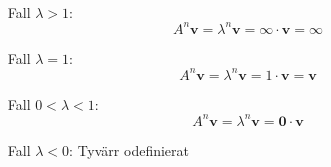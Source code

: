 ~\\
\begin{enumerate}
    \item[Fall $\lambda>1$:]
        \begin{equation*}
            A^n\bm{v}=\lambda^n\bm{v}=\infty\cdot\bm{v}=\bm{\infty}
        \end{equation*}
    \item[Fall $\lambda=1$:] 
        \begin{equation*}
            A^n\bm{v}=\lambda^n\bm{v}=1\cdot\bm{v}=\bm{v}
        \end{equation*}
    \item[Fall $0<\lambda<1$:] 
        \begin{equation*}
            A^n\bm{v}=\lambda^n\bm{v}=\bm{0}\cdot\bm{v}
        \end{equation*}
    \item[Fall $\lambda<0$:] Tyvärr odefinierat
\end{enumerate}